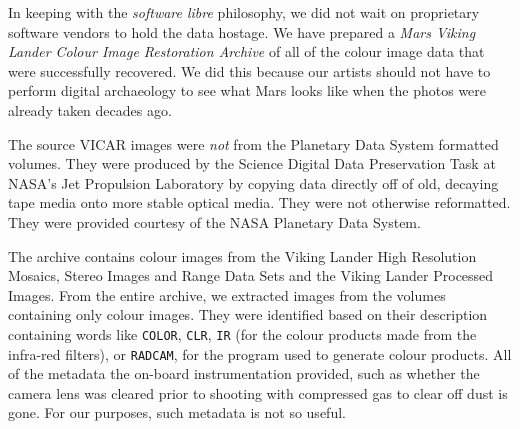 In keeping with the {\it software libre} philosophy, we did not wait on proprietary software vendors to hold the data hostage. We have prepared a {\it Mars Viking Lander Colour Image Restoration Archive} of all of the colour image data that were successfully recovered. We did this because our artists should not have to perform digital archaeology to see what Mars looks like when the photos were already taken decades ago.

The source VICAR images were {\it not} from the Planetary Data System formatted volumes. They were produced by the Science Digital Data Preservation Task at NASA's Jet Propulsion Laboratory by copying data directly off of old, decaying tape media onto more stable optical media. They were not otherwise reformatted. They were provided courtesy of the NASA Planetary Data System.

The archive contains colour images from the Viking Lander High Resolution Mosaics, Stereo Images and Range Data Sets and the Viking Lander Processed Images. From the entire archive, we extracted images from the volumes containing only colour images. They were identified based on their description containing words like {\tt COLOR}, {\tt CLR}, {\tt IR} (for the colour products made from the infra-red filters), or {\tt RADCAM}, for the program used to generate colour products. All of the metadata the on-board instrumentation provided, such as whether the camera lens was cleared prior to shooting with compressed gas to clear off dust is gone. For our purposes, such metadata is not so useful.

\StopChapter

